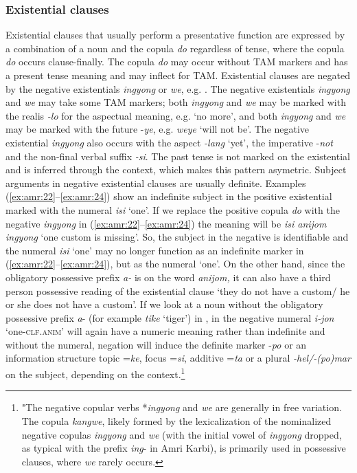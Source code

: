 \documentclass[output=paper,colorlinks,citecolor=brown]{langscibook}
\begin{document}
\subsubsection{Existential clauses} \label{sec:amr:2.3.3}
\largerpage
Existential clauses that usually perform a presentative function are expressed by a combination of a noun and the copula \textit{do} regardless of tense, where the copula \textit{do} occurs clause-finally. The copula \textit{do} may occur without TAM markers and has a present tense meaning and may inflect for TAM. Existential clauses are negated by the negative existentials \textit{ingyong} or \textit{we}, e.g. . The negative existentials \textit{ingyong} and \textit{we} may take some TAM markers; both \textit{ingyong} and \textit{we} may be marked with the realis \textit{{}-lo} for the aspectual meaning, e.g. ‘no more’, and both \textit{ingyong} and \textit{we} may be marked with the future -\textit{ye}, e.g. \textit{weye} ‘will not be’. The negative existential \textit{ingyong} also occurs with the aspect \textit{{}-lang} ‘yet’, the imperative -\textit{not} and the non-final verbal suffix \textit{{}-si}. The past tense is not marked on the existential and is inferred through the context, which makes this pattern asymetric. Subject arguments in negative existential clauses are usually definite. Examples (\ref{ex:amr:22}--\ref{ex:amr:24}) show an indefinite subject in the positive existential marked with the numeral \textit{isi} ‘one’. If we replace the positive copula \textit{do} with the negative \textit{ingyong} in (\ref{ex:amr:22}--\ref{ex:amr:24}) the meaning will be \textit{isi anijom ingyong} ‘one custom is missing’. So, the subject in the negative is identifiable and the numeral \textit{isi} ‘one’ may no longer function as an indefinite marker in (\ref{ex:amr:22}--\ref{ex:amr:24}), but as the numeral ‘one’. On the other hand, since the obligatory possessive prefix \textit{a-} is on the word \textit{anijom,} it can also have a third person possessive reading of the existential clause ‘they do not have a custom/ he or she does not have a custom’. If we look at a noun without the obligatory possessive prefix \textit{a}{}- (for example \textit{tike} ‘tiger’) in , in the negative numeral \textit{i-jon} ‘one-\textsc{clf}.\textsc{anim’} will again have a numeric meaning rather than indefinite and without the numeral, negation will induce the definite marker -\textit{po} or an information structure topic =\textit{ke}, focus =\textit{si}, additive =\textit{ta} or a plural \textit{{}-hel/-(po)mar} on the subject, depending on the context.\footnote{"The negative copular verbs *\textit{ingyong} and \textit{we} are generally in free variation. The copula \textit{kangwe}, likely formed by the lexicalization of the nominalized negative copulas \textit{ingyong} and \textit{we} (with the initial vowel of \textit{ingyong} dropped, as typical with the prefix \textit{ing}- in Amri Karbi), is primarily used in possessive clauses, where \textit{we} rarely occurs.}
\end{document}
